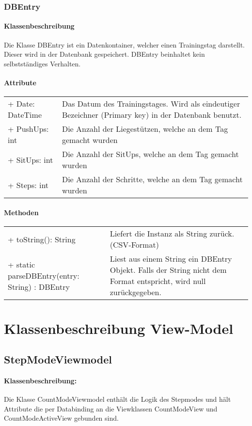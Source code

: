 \documentclass[a4paper,12pt]{article}
\begin{document}
\subsubsection{DBEntry}
	\paragraph{Klassenbeschreibung}
	Die Klasse DBEntry ist ein Datenkontainer, welcher einen Trainingstag darstellt. Dieser wird in der Datenbank gespeichert. DBEntry beinhaltet kein selbstständiges Verhalten.
	
	\paragraph{Attribute}
	\begin{tabular}{p{7cm}p{10cm}}
	+ Date: DateTime & Das Datum des Trainingstages. Wird als eindeutiger Bezeichner (Primary key) in der Datenbank benutzt.\\
	+ PushUps: int & Die Anzahl der Liegestützen, welche an dem Tag gemacht wurden \\
	+ SitUps: int & Die Anzahl der SitUps, welche an dem Tag gemacht wurden \\
	+ Steps: int & Die Anzahl der Schritte, welche an dem Tag gemacht wurden \\
	\end{tabular}
	 
	 \paragraph{Methoden}
	 \begin{tabular}{p{7cm}p{10cm}}
	 + toString(): String & Liefert die Instanz als String zurück. (\gls{CSV}-Format) \\
	 + static parseDBEntry(entry: String) : DBEntry & Liest aus einem String ein DBEntry Objekt. Falls der String nicht dem Format entspricht, wird null zurückgegeben. \\
	\end{tabular}
\section{Klassenbeschreibung View-Model}
\subsection{StepModeViewmodel}
\paragraph{Klassenbeschreibung:}
Die Klasse CountModeViewmodel enthält die Logik des Stepmodes  und hält Attribute die per Databinding an die Viewklassen CountModeView und CountModeActiveView gebunden sind. 
\end{document}
